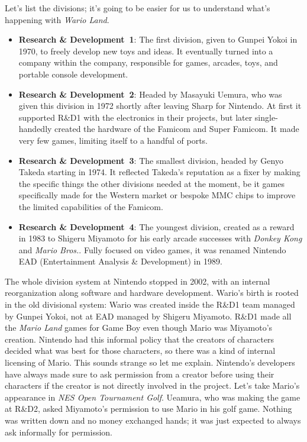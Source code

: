 \documentclass{book}
\begin{document}
Let’s list the divisions; it’s going to be easier for us to understand what’s happening with \emph{Wario Land}.

\begin{itemize} [nosep]
\item \textbf{Research \& Development~1}: The first division, given to Gunpei Yokoi in 1970, to freely develop new toys and ideas. It eventually turned into a company within the company, responsible for games, arcades, toys, and portable console development.
\item \textbf{Research \& Development~2}: Headed by Masayuki Uemura, who was given this division in 1972 shortly after leaving Sharp for Nintendo. At first it supported R\&D1 with the electronics in their projects, but later single-handedly created the hardware of the Famicom and Super Famicom. It made very few games, limiting itself to a handful of ports.
\item \textbf{Research \& Development~3}: The smallest division, headed by Genyo Takeda starting in 1974. It reflected Takeda’s reputation as a fixer by making the specific things the other divisions needed at the moment, be it games specifically made for the Western market or bespoke MMC chips to improve the limited capabilities of the Famicom.
\item \textbf{Research \& Development~4}: The youngest division, created as a reward in 1983 to Shigeru Miyamoto for his early arcade successes with \emph{Donkey Kong} and \emph{Mario Bros.}. Fully focused on video games, it was renamed Nintendo EAD (Entertainment Analysis \& Development) in 1989.
\end{itemize}\noindent

The whole division system at Nintendo stopped in 2002, with an internal reorganization along software and hardware development. Wario’s birth is rooted in the old divisional system: Wario was created inside the R\&D1 team managed by Gunpei Yokoi, not at EAD managed by Shigeru Miyamoto. R\&D1 made all the \emph{Mario Land} games for Game Boy even though Mario was Miyamoto’s creation. Nintendo had this informal policy that the creators of characters decided what was best for those characters, so there was a kind of internal licensing of Mario. This sounds strange so let me explain. Nintendo’s developers have always made sure to ask permission from a creator before using their characters if the creator is not directly involved in the project. Let’s take Mario’s appearance in \emph{NES Open Tournament Golf}. Ueamura, who was making the game at R\&D2, asked Miyamoto’s permission to use Mario in his golf game. Nothing was written down and no money exchanged hands; it was just expected to always ask informally for permission.
\end{document}
